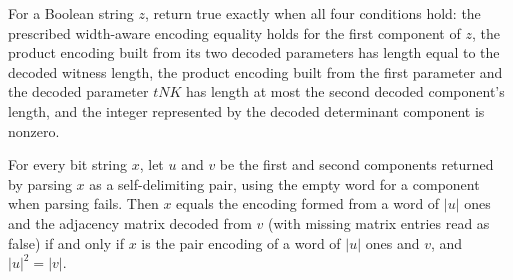 \begin{definition}
\label{Randomized.Matching.matchingTest}
\leanok
{}
For a Boolean string $z$, return true exactly when all four conditions hold: the
prescribed width-aware encoding equality holds for the first component of $z$, the
product encoding built from its two decoded parameters has length equal to the decoded
witness length, the product encoding built from the first parameter and the decoded
parameter $tNK$ has length at most the second decoded component's length, and the
integer represented by the decoded determinant component is nonzero.
\end{definition}

\begin{theorem}
\label{Randomized.Matching.eq_encodeBPM_iff}
\leanok
{}
For every bit string $x$, let $u$ and $v$ be the first and second components returned by
parsing $x$ as a self-delimiting pair, using the empty word for a component when parsing
fails. Then $x$ equals the encoding formed from a word of $|u|$ ones and the adjacency
matrix decoded from $v$ (with missing matrix entries read as false) if and only if $x$
is the pair encoding of a word of $|u|$ ones and $v$, and $|u|^2=|v|$.
\end{theorem}

